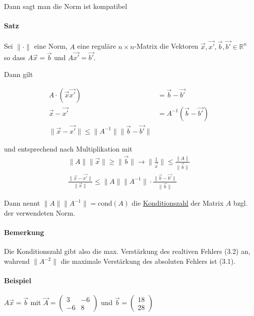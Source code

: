 \documentclass[a4paper,ngerman]{scrbook}
\newcommand{\R}{\ensuremath{\mathds{R}}}%
\begin{document}
Dann sagt man die Norm ist kompatibel

\paragraph{Satz}

Sei $\|\cdot\|$ eine Norm, $A$ eine reguläre $n\times n$-Matrix die Vektoren $\vec{x}, \vec{x'}, \vec{b}, \vec{b'} \in \R^n$ so dass $A\vec{x} = \vec{b}$ und $A\vec{x'} = \vec{b'}$.

Dann gilt

\begin{align*}
  A\cdot (\vec{x}\vec{x'}) &= \vec{b} - \vec{b'}\\
  \vec{x} - \vec{x'} &= A^{-1}(\vec{b} - \vec{b'})\\
  \|\vec{x}-\vec{x'}\| \leq \|A^{-1}\| \|\vec{b} - \vec{b'}\|
\end{align*}

und entsprechend nach Multiplikation mit
\begin{align}
  \|A\|\|\vec{x}\| \geq \|\vec{b}\| \to   \|\frac{1}{\vec{x}}\| \leq     \frac{\|A\|}{\|\vec{b}\|}\\
  \frac{\|\vec{x} - \vec{x'}\|}{\|\vec{x}\|} \leq \|A\| \|A^{-1}\| \cdot \frac{\|\vec{b}-\vec{b'}\|}{\|\vec{b}\|}
\end{align}

Dann nennt $\|A\| \|A^{-1}\| = \text{cond}(A)$ die \underline{Konditionszahl} der Matrix $A$ bzgl\@. der verwendeten Norm.

\paragraph{Bemerkung}

Die Konditionszahl gibt also die max\@. Verstärkung des realtiven Fehlers (3.2) an, wahrend $\|A^{-2}\|$ die maximale Verstärkung des absoluten Fehlers ist (3.1).

\paragraph{Beispiel}

$A\vec{x} = \vec{b}$ mit $\vec{A} =
\begin{pmatrix}
  3 & -6 \\ -6 & 8
\end{pmatrix}$ und $ \vec{b} =
\begin{pmatrix}
  18\\ 28
\end{pmatrix}
$
\end{document}
